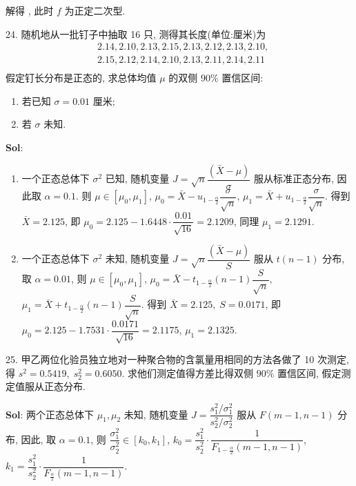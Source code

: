 解得 , 此时 $f$ 为正定二次型.


\vspace{12pt}

24. 随机地从一批钉子中抽取 16 只, 测得其长度(单位:厘米)为
$$
\begin{aligned}
&2.14,2.10,2.13,2.15,2.13,2.12,2.13,2.10,\\
&2.15,2.12,2.14,2.10,2.13,2.11,2.14,2.11\\
\end{aligned}
$$
假定钉长分布是正态的, 求总体均值 $\mu$ 的双侧 $90\%$ 置信区间:
\begin{enumerate}[(1)]
    \item 若已知 $\sigma=0.01$ 厘米;
    \item 若 $\sigma$ 未知.
\end{enumerate}

\textbf{Sol}: 

\begin{enumerate}[(1)]
    \item 一个正态总体下 $\sigma^2$ 已知, 
    随机变量 $J=\sqrt{n}\dfrac{(\bar{X}-\mu)}{\sigma}$ 服从标准正态分布, 
    因此取 $\alpha=0.1$. 则 $\mu\in[\mu_0,\mu_1]$, 
    $\mu_0=\bar{X}-u_{1-\frac{\alpha}{2}}\dfrac{\sigma}{\sqrt{n}}$, 
    $\mu_1=\bar{X}+u_{1-\frac{\alpha}{2}}\dfrac{\sigma}{\sqrt{n}}$. 得到 $\bar{X}=2.125$, 即 $\mu_0=2.125-1.6448\cdot\dfrac{0.01}{\sqrt{16}}=2.1209$, 同理 $\mu_1=2.1291$. 
    \mymathbox{[2.1209,2.1291]}
    \item 一个正态总体下 $\sigma^2$ 未知, 随机变量 $J=\sqrt{n}\dfrac{(\bar{X}-\mu)}{S}$ 服从 $t(n-1)$ 分布, 取 $\alpha=0.01$, 则 $\mu\in[\mu_0,\mu_1]$, $\mu_0=\bar{X}-t_{1-\frac{\alpha}{2}}(n-1)\dfrac{S}{\sqrt{n}}$, $\mu_1=\bar{X}+t_{1-\frac{\alpha}{2}}(n-1)\dfrac{S}{\sqrt{n}}$. 得到 $\bar{X}=2.125,\;S=0.0171$, 即 $\mu_0=2.125-1.7531\cdot\dfrac{0.0171}{\sqrt{16}}=2.1175$, $\mu_1=2.1325$. 
    \mymathbox{[2.1175,2.1325]}
\end{enumerate}


\vspace{12pt}

25. 甲乙两位化验员独立地对一种聚合物的含氯量用相同的方法各做了 10 次测定, 得 $s^2=0.5419,\;s_2^2=0.6050$. 求他们测定值得方差比得双侧 $90\%$ 置信区间, 假定测定值服从正态分布.

\textbf{Sol}: 
两个正态总体下 $\mu_1,\mu_2$ 未知, 随机变量 $J=\dfrac{s_1^2/\sigma_1^2}{s_2^2/\sigma_2^2}$ 服从 $F(m-1,n-1)$ 分布, 因此, 取 $\alpha=0.1$, 则 $\dfrac{\sigma_1^2}{\sigma_2^2}\in[k_0,k_1]$, $k_0=\dfrac{s_1^2}{s_2^2}\cdot\dfrac{1}{F_{1-\frac{\alpha}{2}}(m-1,n-1)}$, $k_1=\dfrac{s_1^2}{s_2^2}\cdot\dfrac{1}{F_{\frac{\alpha}{2}}(m-1,n-1)}$.

